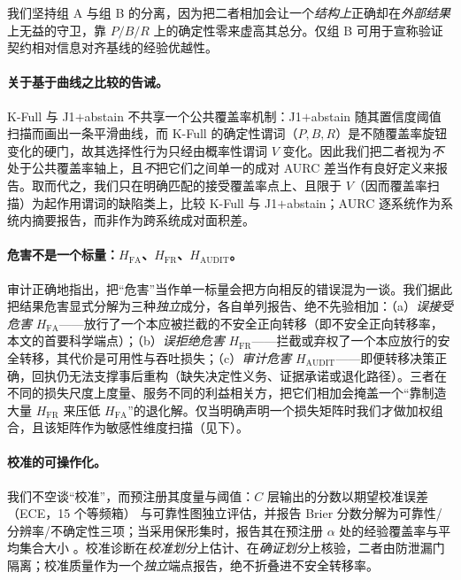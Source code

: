 \documentclass[11pt]{ctexart}
\begin{document}
我们坚持组 A 与组 B 的分离，因为把二者相加会让一个\emph{结构上}正确却在\emph{外部结果}上无益的守卫，靠 $P/B/R$ 上的确定性零来虚高其总分。仅组 B 可用于宣称验证契约相对信息对齐基线的经验优越性。

\paragraph{关于基于曲线之比较的告诫。} K-Full 与 J1$+$abstain 不共享一个公共覆盖率机制：J1$+$abstain 随其置信度阈值扫描而画出一条平滑曲线，而 K-Full 的确定性谓词（$P,B,R$）是不随覆盖率旋钮变化的硬门，故其选择性行为只经由概率性谓词 $V$ 变化。因此我们把二者视为\emph{不}处于公共覆盖率轴上，且\emph{不}把它们之间单一的成对 AURC 差当作有良好定义来报告。取而代之，我们只在明确匹配的接受覆盖率点上、且限于 $V$（因而覆盖率扫描）为起作用谓词的缺陷类上，比较 K-Full 与 J1$+$abstain；AURC 逐系统作为系统内摘要报告，而非作为跨系统成对面积差。

\paragraph{危害不是一个标量：$H_{\mathrm{FA}}$、$H_{\mathrm{FR}}$、$H_{\mathrm{AUDIT}}$。} 审计正确地指出，把“危害”当作单一标量会把方向相反的错误混为一谈。我们据此把结果危害显式分解为三种\emph{独立}成分，各自单列报告、绝不先验相加：（a）\emph{误接受危害} $H_{\mathrm{FA}}$——放行了一个本应被拦截的不安全正向转移（即不安全正向转移率，本文的首要科学端点）；（b）\emph{误拒绝危害} $H_{\mathrm{FR}}$——拦截或弃权了一个本应放行的安全转移，其代价是可用性与吞吐损失；（c）\emph{审计危害} $H_{\mathrm{AUDIT}}$——即便转移决策正确，回执仍无法支撑事后重构（缺失决定性义务、证据承诺或退化路径）。三者在不同的损失尺度上度量、服务不同的利益相关方，把它们相加会掩盖一个“靠制造大量 $H_{\mathrm{FR}}$ 来压低 $H_{\mathrm{FA}}$”的退化解。仅当明确声明一个损失矩阵时我们才做加权组合，且该矩阵作为敏感性维度扫描（见下）。

\paragraph{校准的可操作化。} 我们不空谈“校准”，而预注册其度量与阈值：$C$ 层输出的分数以期望校准误差（ECE，15 个等频箱）\cite{guo2017calibration} 与可靠性图独立评估，并报告 Brier 分数分解为可靠性/分辨率/不确定性三项；当采用保形集时，报告其在预注册 $\alpha$ 处的经验覆盖率与平均集合大小 \cite{vovk2005algorithmic,angelopoulos2023conformal}。校准诊断在\emph{校准划分}上估计、在\emph{确证划分}上核验，二者由防泄漏门隔离；校准质量作为一个\emph{独立}端点报告，绝不折叠进不安全转移率。
\end{document}
